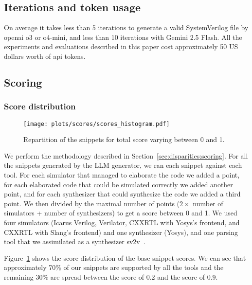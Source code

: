 \subsection{Iterations and token usage}
\label{sec:eval:iterations}

On average it takes less than 5 iterations to generate a valid SystemVerilog file by openai o3 or o4-mini, and less than 10 iterations with Gemini 2.5 Flash.
All the experiments and evaluations described in this paper cost approximately 50 US dollars worth of api tokens.

\subsection{Scoring}
\label{sec:eval:scoring}

\subsubsection{Score distribution}
\label{sec:eval:score-distribution}

\begin{figure}[t]
    \centering
    \texttt{[image: plots/scores/scores\_histogram.pdf]}
    \vspace{-2em}
    \caption{Repartition of the snippets for total score varying between 0 and 1.}
    \label{fig:sscr}
    \vspace{-1em}
\end{figure}

We perform the methodology described in Section~\ref{sec:disparities:scoring}.
For all the snippets generated by the LLM generator, we ran each snippet against each tool.
For each simulator that managed to elaborate the code we added a point,
for each elaborated code that could be simulated correctly we added another point,
and for each synthesizer that could synthesize the code we added a third point.
We then divided by the maximal number of points ($2 \times $ number of simulators + number of synthesizers) to get a score between 0 and 1.
We used four simulators (Icarus Verilog, Verilator, CXXRTL with Yosys's frontend, and CXXRTL with Slang's frontend) and one synthesizer (Yosys),
and one parsing tool that we assimilated as a synthesizer sv2v~\cite{sv2v}.

Figure~\ref{fig:sscr} shows the score distribution of the base snippet scores.
We can see that approximately 70\% of our snippets are supported by all the tools and the remaining 30\% are spread between the score of 0.2 and the score of 0.9.

